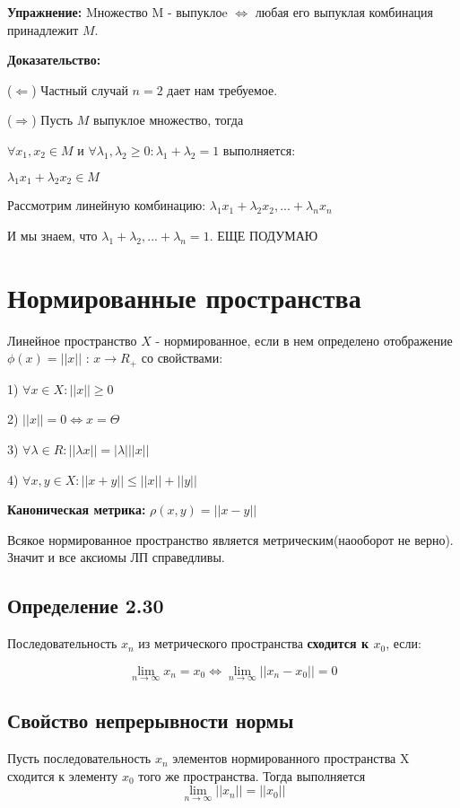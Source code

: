 \documentclass[12pt, english]{article}
\begin{document}
\textbf{Упражнение:}
	Mножество M - выпуклоe $\Leftrightarrow$ любая его выпуклая комбинация принадлежит $M$.
	
\textbf{Доказательство:}
	
	($\Leftarrow$) Частный случай $n = 2$ дает нам требуемое.
	
	($\Rightarrow$) Пусть $M$ выпуклое множество, тогда
	
	$\forall x_1, x_2 \in M$ и $\forall \lambda_1 , \lambda_2 \ge 0 : \lambda_1 + \lambda_2 = 1$ выполняется:
		
	$\lambda_1 x_1 + \lambda_2 x_2 \in M$
	
	Рассмотрим линейную комбинацию:
	$\lambda_1 x_1 + \lambda_2 x_2, ... + \lambda_n x_n$
	
	И мы знаем, что $\lambda_1 + \lambda_2, ... + \lambda_n = 1$. ЕЩЕ ПОДУМАЮ
	
\section{Нормированные пространства}
		Линейное пространство $X$ - нормированное, если в нем определено отображение $\phi(x) = ||x||$ : $ x \to R_+$ со свойствами:
		
		1) $\forall x \in X: ||x|| \ge 0$
		
		2) $||x|| = 0 \Leftrightarrow x = \Theta$
		
		3) $\forall \lambda \in R:  || \lambda x || = |\lambda|||x||$
		
		4) $\forall x,y \in X : ||x + y || \leq ||x|| + ||y||$
	
		\textbf{Каноническая метрика:} $\rho(x,y) = ||x-y||$
		
		Всякое нормированное пространство является метрическим(наооборот не верно). Значит и все аксиомы ЛП справедливы.
		
\subsection*{Определение 2.30}
	
	Последовательность ${x_n}$ из метрического пространства \textbf{сходится к $x_0$}, если:
	
	$$\lim_{n \to \infty} x_n = x_0 \Leftrightarrow \lim_{n \to \infty} ||x_n - x_0|| = 0$$
	
\subsection*{Свойство непрерывности нормы}
	Пусть последовательность ${x_n}$ элементов нормированного пространства X сходится к элементу $x_0$ того же пространства. Тогда выполняется	
	$$\lim_{n \to \infty} ||x_n|| = ||x_0||$$
		
\end{document}
